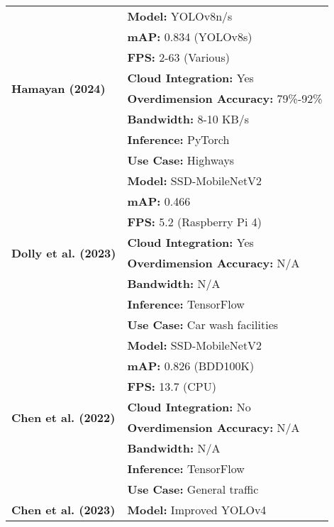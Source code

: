 \begin{table}[htbp]
\begin{tabular}{|l|l|}
    \hline
    \multirow{8}{*}{\textbf{Hamayan (2024) \cite{hamayan2024}}} & \textbf{Model:} YOLOv8n/s \\
    \cline{2-2}
    & \textbf{mAP:} 0.834 (YOLOv8s) \\
    \cline{2-2}
    & \textbf{FPS:} 2-63 (Various) \\
    \cline{2-2}
    & \textbf{Cloud Integration:} Yes \\
    \cline{2-2}
    & \textbf{Overdimension Accuracy:} 79\%-92\% \\
    \cline{2-2}
    & \textbf{Bandwidth:} 8-10 KB/s \\
    \cline{2-2}
    & \textbf{Inference:} PyTorch \\
    \cline{2-2}
    & \textbf{Use Case:} Highways \\
    \hline
    \multirow{8}{*}{\textbf{Dolly et al. (2023) \cite{dolly2023}}} & \textbf{Model:} SSD-MobileNetV2 \\
    \cline{2-2}
    & \textbf{mAP:} 0.466 \\
    \cline{2-2}
    & \textbf{FPS:} 5.2 (Raspberry Pi 4) \\
    \cline{2-2}
    & \textbf{Cloud Integration:} Yes \\
    \cline{2-2}
    & \textbf{Overdimension Accuracy:} N/A \\
    \cline{2-2}
    & \textbf{Bandwidth:} N/A \\
    \cline{2-2}
    & \textbf{Inference:} TensorFlow \\
    \cline{2-2}
    & \textbf{Use Case:} Car wash facilities \\
    \hline
    \multirow{8}{*}{\textbf{Chen et al. (2022) \cite{Chen2022Fast}}} & \textbf{Model:} SSD-MobileNetV2 \\
    \cline{2-2}
    & \textbf{mAP:} 0.826 (BDD100K) \\
    \cline{2-2}
    & \textbf{FPS:} 13.7 (CPU) \\
    \cline{2-2}
    & \textbf{Cloud Integration:} No \\
    \cline{2-2}
    & \textbf{Overdimension Accuracy:} N/A \\
    \cline{2-2}
    & \textbf{Bandwidth:} N/A \\
    \cline{2-2}
    & \textbf{Inference:} TensorFlow \\
    \cline{2-2}
    & \textbf{Use Case:} General traffic \\
    \hline
    \multirow{8}{*}{\textbf{Chen et al. (2023) \cite{Chen2023Edge}}} & \textbf{Model:} Improved YOLOv4 \\

\end{tabular}
\end{table}
